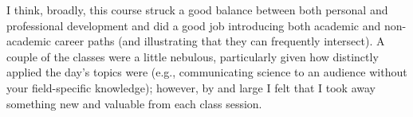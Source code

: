 \documentclass[11pt,letterpaper,final] {article}
\begin{document}
	I think, broadly, this course struck a good balance between both personal and professional development and did a good job introducing both academic and non-academic career paths (and illustrating that they can frequently intersect). A couple of the classes were a little nebulous, particularly given how distinctly applied the day's topics were (e.g., communicating science to an audience without your field-specific knowledge); however, by and large I felt that I took away something new and valuable from each class session.


% 
% 
\end{document}
